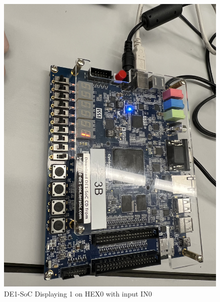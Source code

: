 \documentclass[
	letterpaper, %
	10pt, %
]{CSUniSchoolLabReport}
\begin{document}
\begin{figure}[H]
  \centering
  \includegraphics[width=.9\textwidth]{Figures/Disp_1.jpg}
  \caption{DE1-SoC Displaying 1 on HEX0 with input IN0}
  \label{fig:4}
\end{figure}
\end{document}
